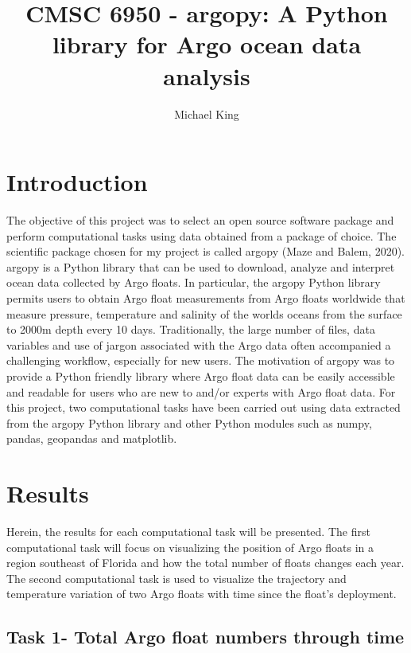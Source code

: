 \documentclass{article}
\title{CMSC 6950 - argopy: A Python library for Argo ocean data analysis}
\author{Michael King}
\begin{document}
\maketitle

\section{Introduction}

The objective of this project was to select an open source software package and perform computational tasks using data obtained from a package of choice. The scientific package chosen for my project is called argopy (Maze and Balem, 2020). argopy is a Python library that can be used to download, analyze and interpret ocean data collected by Argo floats. In particular, the argopy Python library permits users to obtain Argo float measurements from Argo floats worldwide that measure pressure, temperature and salinity of the worlds oceans from the surface to 2000m depth every 10 days. Traditionally, the large number of files, data variables and use of jargon associated with the Argo data often accompanied a challenging workflow, especially for new users. The motivation of argopy was to provide a Python friendly library where Argo float data can be easily accessible and readable for users who are new to and/or experts with Argo float data. For this project, two computational tasks have been carried out using data extracted from the argopy Python library and other Python modules such as numpy, pandas, geopandas and matplotlib. 

    

\section{Results}

Herein, the results for each computational task will be presented. The first computational task will focus on visualizing the position of Argo floats in a region southeast of Florida and how the total number of floats changes each year. The second computational task is used to visualize the trajectory and temperature variation of two Argo floats with time since the float's deployment.

\subsection{Task 1- Total Argo float numbers through time}
\end{document}
